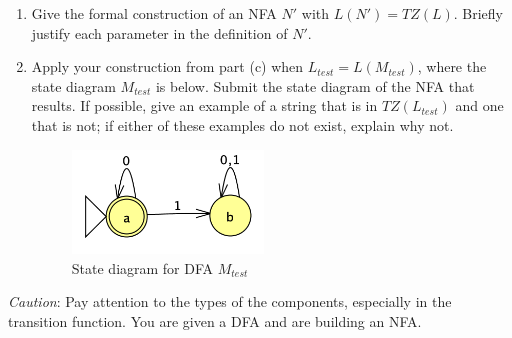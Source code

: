 \begin{enumerate}
\begin{enumerate}
\item Give the formal construction of an NFA $N'$ with $L(N') = TZ(L)$.  Briefly justify 
each parameter in the definition of  $N'$. 
\item Apply your construction from part (c)  when $L_{test} = L(M_{test})$, where the 
state diagram $M_{test}$ is below.  Submit the state diagram of the NFA that results.
If possible, give an example of a string that is in $TZ(L_{test})$ and one that is not; if either of these examples
do not exist, explain why not.
\begin{figure}[h]
   \centering
   \includegraphics[width=2in]{../../resources/machines/MtestDFA.png}
   \caption{State diagram for DFA $M_{test}$}
\end{figure}
\end{enumerate}
{\it Caution}: Pay attention to the types of the components, especially
in the transition function.  You are given a DFA and are building an NFA.
\end{enumerate}
